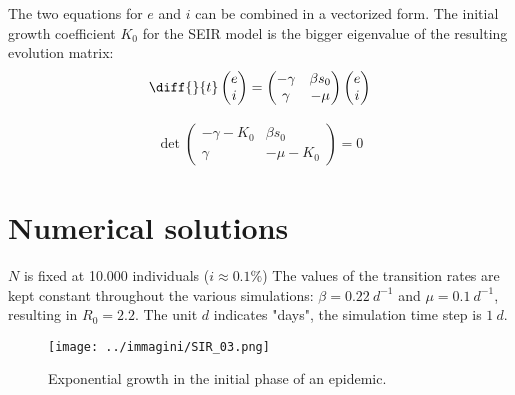 \documentclass[DIV=12, BCOR=0pt]{scrartcl}  %
\begin{document}
  The two equations for $e$ and $i$ can be combined in a vectorized form. The initial growth coefficient $K_0$ for the SEIR model is the bigger eigenvalue of the resulting evolution matrix: 
  \begin{align}
  	\diff{}{t}
  	\begin{pmatrix}
  			e \\
  			i
  	\end{pmatrix}
  	= 
  	\begin{pmatrix}
  		 - \gamma & \beta s_0\\
  		 \gamma & - \mu
  	\end{pmatrix}
  	\begin{pmatrix}
  		e \\
  		i
  	\end{pmatrix}
	\end{align}

	\begin{align}
		\det 
		\begin{pmatrix}
			- \gamma - K_0 & \beta s_0\\
			\gamma & - \mu - K_0
		\end{pmatrix} = 0
	\end{align}
 
	
	
  
  
  
  
  \section{Numerical solutions}
	

	
	$N$ is fixed at 10.000 individuals
	($i \approx 0.1 \%$)
	The values of the transition rates are kept constant throughout the various simulations: $\beta = 0.22 \ d^{-1}$ and $\mu = 0.1 \ d^{-1}$, resulting in $R_0 = 2.2$. The unit $d$ indicates "days", the simulation time step is $1 \ d$.
		
	 \begin{figure}[h!]
		\centering
		\texttt{[image: ../immagini/SIR\_03.png]}
		\caption{Exponential growth in the initial phase of an epidemic. }
		\label{fig:SIRexp}
	\end{figure}
\end{document}

